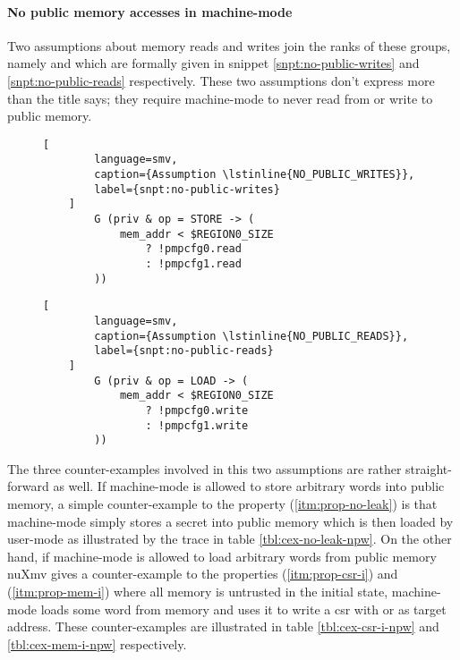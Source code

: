 \paragraph{No public memory accesses in machine-mode}
Two assumptions about memory reads and writes join the ranks of these groups, namely  and  which are formally given in snippet \ref{snpt:no-public-writes} and \ref{snpt:no-public-reads} respectively.
These two assumptions don't express more than the title says; they require machine-mode to never read from or write to public memory.

\begin{figure}
    \begin{lstlisting}[
        language=smv,
        caption={Assumption \lstinline{NO_PUBLIC_WRITES}},
        label={snpt:no-public-writes}
    ]
        G (priv & op = STORE -> (
            mem_addr < $REGION0_SIZE
                ? !pmpcfg0.read
                : !pmpcfg1.read
        ))
    \end{lstlisting}
\end{figure}

\begin{figure}
    \begin{lstlisting}[
        language=smv,
        caption={Assumption \lstinline{NO_PUBLIC_READS}},
        label={snpt:no-public-reads}
    ]
        G (priv & op = LOAD -> (
            mem_addr < $REGION0_SIZE
                ? !pmpcfg0.write
                : !pmpcfg1.write
        ))
    \end{lstlisting}
\end{figure}

The three counter-examples involved in this two assumptions are rather straight-forward as well.
If machine-mode is allowed to store arbitrary words into public memory, a simple counter-example to the  property (\ref{itm:prop-no-leak}) is that machine-mode simply stores a secret into public memory which is then loaded by user-mode as illustrated by the trace in table \ref{tbl:cex-no-leak-npw}.
On the other hand, if machine-mode is allowed to load arbitrary words from public memory nuXmv gives a counter-example to the properties  (\ref{itm:prop-csr-i}) and  (\ref{itm:prop-mem-i}) where all memory is untrusted in the initial state, machine-mode loads some word from memory and uses it to write a \gls{csr} with or as target address.
These counter-examples are illustrated in table \ref{tbl:cex-csr-i-npw} and \ref{tbl:cex-mem-i-npw} respectively.

